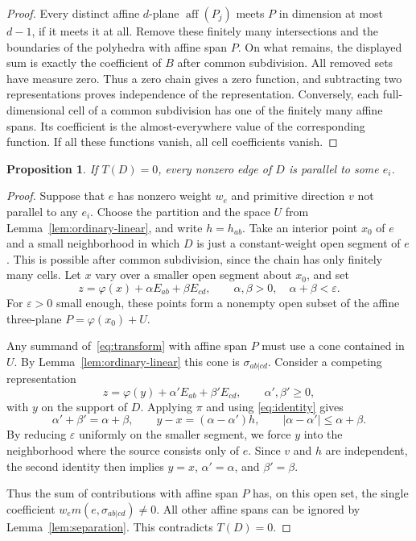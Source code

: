 \documentclass[11pt]{article}
\newtheorem{proposition}[theorem]{Proposition}
\theoremstyle{definition}
\theoremstyle{remark}
\newcommand{\aff}{\operatorname{aff}}
\begin{document}
\begin{proof}
Every distinct affine $d$-plane $\aff(P_j)$ meets $P$ in dimension at
most $d-1$, if it meets it at all. Remove these finitely many intersections
and the boundaries of the polyhedra with affine span $P$. On what
remains, the displayed sum is exactly the coefficient of $B$ after
common subdivision. All removed sets have measure zero. Thus a zero
chain gives a zero function, and subtracting two representations proves
independence of the representation. Conversely, each full-dimensional
cell of a common subdivision has one of the finitely many affine spans.
Its coefficient is the almost-everywhere value of the corresponding
function. If all these functions vanish, all cell coefficients vanish.
\end{proof}

\begin{proposition}\label{prop:ordinary}
If $T(D)=0$, every nonzero edge of $D$ is parallel to some $e_i$.
\end{proposition}

\begin{proof}
Suppose that $e$ has nonzero weight $w_e$ and primitive direction $v$
not parallel to any $e_i$. Choose the partition and the space $U$ from
Lemma~\ref{lem:ordinary-linear}, and write $h=h_{ab}$.
Take an interior point $x_0$ of $e$ and a small neighborhood in which
$D$ is just a constant-weight open segment of $e$. This is possible
after common subdivision, since the chain has only finitely many cells.
Let $x$ vary over a smaller open segment about $x_0$, and set
\[
 z=\varphi(x)+\alpha E_{ab}+\beta E_{cd},
 \qquad \alpha,\beta>0,\quad \alpha+\beta<\varepsilon.
\]
For $\varepsilon>0$ small enough, these points form a nonempty open
subset of the affine three-plane $P=\varphi(x_0)+U$.

Any summand of~\eqref{eq:transform} with affine span $P$ must use a
cone contained in $U$. By Lemma~\ref{lem:ordinary-linear} this cone
is $\sigma_{ab|cd}$. Consider a competing representation
\[
 z=\varphi(y)+\alpha'E_{ab}+\beta'E_{cd},
 \qquad \alpha',\beta'\ge0,
\]
with $y$ on the support of $D$. Applying $\pi$ and using
\eqref{eq:identity} gives
\begin{equation}\label{eq:localization}
 \alpha'+\beta'=\alpha+\beta,\qquad
 y-x=(\alpha-\alpha')h,\qquad
 |\alpha-\alpha'|\le\alpha+\beta.
\end{equation}
By reducing $\varepsilon$ uniformly on the smaller segment, we force
$y$ into the neighborhood where the source consists only of $e$.
Since $v$ and $h$ are independent, the second identity then implies
$y=x$, $\alpha'=\alpha$, and $\beta'=\beta$.

Thus the sum of contributions with affine span $P$ has, on this open
set, the single coefficient $w_e m(e,\sigma_{ab|cd})\ne0$.
All other affine spans can be ignored by
Lemma~\ref{lem:separation}. This contradicts $T(D)=0$.
\end{proof}
\end{document}
